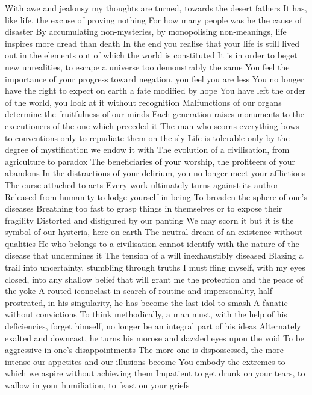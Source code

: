 \documentclass{article}
\begin{document}
\iffalse
With awe and jealousy my thoughts are turned, towards the desert fathers
It has, like life, the excuse of proving nothing
For how many people was he the cause of disaster
By accumulating non-mysteries, by monopolising non-meanings, life inspires more dread than death
In the end you realise that your life is still lived out in the elements out of which the world is constituted
It is in order to beget new unrealities, to escape a universe too demonstrably the same
You feel the importance of your progress toward negation, you feel you are less
You no longer have the right to expect on earth a fate modified by hope
You have left the order of the world, you look at it without recognition
Malfunctions of our organs determine the fruitfulness of our minds
Each generation raises monuments to the executioners of the one which preceded it
The man who scorns everything bows to conventions only to repudiate them on the sly
Life is tolerable only by the degree of mystification we endow it with
The evolution of a civilisation, from agriculture to paradox
The beneficiaries of your worship, the profiteers of your abandons
In the distractions of your delirium, you no longer meet your afflictions
The curse attached to acts
Every work ultimately turns against its author
Released from humanity to lodge yourself in being
To broaden the sphere of one's diseases
Breathing too fast to grasp things in themselves or to expose their fragility
Distorted and disfigured by our panting
We may scorn it but it is the symbol of our hysteria, here on earth
The neutral dream of an existence without qualities
He who belongs to a civilisation cannot identify with the nature of the disease that undermines it
The tension of a will inexhaustibly diseased
Blazing a trail into uncertainty, stumbling through truths
I must fling myself, with my eyes closed, into any shallow belief that will grant me the protection and the peace of the yoke
A routed iconoclast in search of routine and impersonality, half prostrated, in his singularity, he has become the last idol to smash
A fanatic without convictions
To think methodically, a man must, with the help of his deficiencies, forget himself, no longer be an integral part of his ideas
Alternately exalted and downcast, he turns his morose and dazzled eyes upon the void
To be aggressive in one's disappointments
The more one is dispossessed, the more intense our appetites and our illusions become
You embody the extremes to which we aspire without achieving them
Impatient to get drunk on your tears, to wallow in your humiliation, to feast on your griefs
\end{document}
